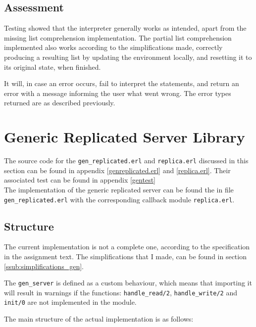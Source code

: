 \documentclass[a4paper]{article}
\begin{document}
\subsection{Assessment}
\label{sub:Assessment_i}
Testing showed that the interpreter generally works as intended, apart from the missing list comprehension implementation. The partial list comprehension implemented also works according to the simplifications made, correctly producing a resulting list by updating the environment locally, and resetting it to its original state, when finished.

It will, in case an error occurs, fail to interpret the statements, and return an error with a message informing the user what went wrong. The error types returned are as described previously.
\section{Generic Replicated Server Library}
The source code for the \texttt{gen\_replicated.erl} and \texttt{replica.erl} discussed in this section can be found in appendix \ref{genreplicated.erl} and \ref{replica.erl}. Their associated test can be found in appendix \ref{gentest}\\

The implementation of the generic replicated server can be found the in file \texttt{gen\_replicated.erl} with the corresponding callback module \texttt{replica.erl}.
\subsection{Structure}
\label{sub:Structure}
The current implementation is not a complete one, according to the specification in the assignment text. The simplifications that I made, can be found in section \ref{ssub:simplifications_gen}.

The \texttt{gen\_server} is defined as a custom behaviour, which means that importing it will result in warnings if the functions: \texttt{handle\_read/2}, \texttt{handle\_write/2} and \texttt{init/0} are not implemented in the module.

The main structure of the actual implementation is as follows:
\end{document}
